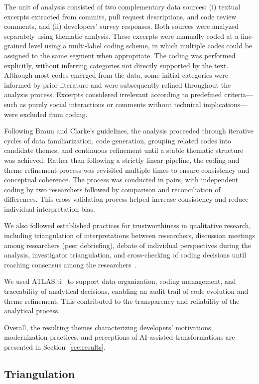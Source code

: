 The unit of analysis consisted of two complementary data sources: (i) textual excerpts extracted from commits, pull request descriptions, and code review comments, and (ii) developers’ survey responses. Both sources were analyzed separately using thematic analysis. These excerpts were manually coded at a fine-grained level using a multi-label coding scheme, in which multiple codes could be assigned to the same segment when appropriate. The coding was performed explicitly, without inferring categories not directly supported by the text. Although most codes emerged from the data, some initial categories were informed by prior literature and were subsequently refined throughout the analysis process. Excerpts considered irrelevant according to predefined criteria—such as purely social interactions or comments without technical implications—were excluded from coding.

Following Braun and Clarke’s guidelines, the analysis proceeded through iterative cycles of data familiarization, code generation, grouping related codes into candidate themes, and continuous refinement until a stable thematic structure was achieved. Rather than following a strictly linear pipeline, the coding and theme refinement process was revisited multiple times to ensure consistency and conceptual coherence. The process was conducted in pairs, with independent coding by two researchers followed by comparison and reconciliation of differences. This cross-validation process helped increase consistency and reduce individual interpretation bias.

We also followed established practices for trustworthiness in qualitative research, including triangulation of interpretations between researchers, discussion meetings among researchers (peer debriefing), debate of individual perspectives during the analysis, investigator triangulation, and cross-checking of coding decisions until reaching consensus among the researchers~\cite{Nowell2017Trustworthiness}.

We used ATLAS.ti~\cite{atlas_ti} to support data organization, coding management, and traceability of analytical decisions, enabling an audit trail of code evolution and theme refinement. This contributed to the transparency and reliability of the analytical process.

Overall, the resulting themes characterizing developers’ motivations, modernization practices, and perceptions of AI-assisted transformations are presented in Section~\ref{sec:results}.


\subsection{Triangulation}

